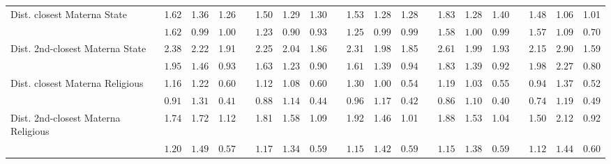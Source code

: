 \begin{center}
{\begin{longtable}{L{5cm} c c c p{.5cm} c c c p{.5cm} c c c p{.5cm} c c c p{.5cm} c c c}
Dist. closest Materna State & 1.62 &      1.36 &      1.26 & &      1.50 &      1.29 &      1.30 & &      1.53 &      1.28 &      1.28 & &      1.83 &      1.28 &      1.40 & &      1.48 &      1.06 &      1.01 \\*
& $\mathit{     1.62}$ & $\mathit{     0.99}$ & $\mathit{     1.00}$ & & $\mathit{     1.23}$ & $\mathit{     0.90}$ & $\mathit{     0.93}$ & & $\mathit{     1.25}$ & $\mathit{     0.99}$ & $\mathit{     0.99}$ & & $\mathit{     1.58}$ & $\mathit{     1.00}$ & $\mathit{     0.99}$ & & $\mathit{     1.57}$ & $\mathit{     1.09}$ & $\mathit{     0.70}$ \\[.7em]
Dist. 2nd-closest Materna State & 2.38 &      2.22 &      1.91 & &      2.25 &      2.04 &      1.86 & &      2.31 &      1.98 &      1.85 & &      2.61 &      1.99 &      1.93 & &      2.15 &      2.90 &      1.59 \\*
& $\mathit{     1.95}$ & $\mathit{     1.46}$ & $\mathit{     0.93}$ & & $\mathit{     1.63}$ & $\mathit{     1.23}$ & $\mathit{     0.90}$ & & $\mathit{     1.61}$ & $\mathit{     1.39}$ & $\mathit{     0.94}$ & & $\mathit{     1.83}$ & $\mathit{     1.39}$ & $\mathit{     0.92}$ & & $\mathit{     1.98}$ & $\mathit{     2.27}$ & $\mathit{     0.80}$ \\[.7em]
Dist. closest Materna Religious & 1.16 &      1.22 &      0.60 & &      1.12 &      1.08 &      0.60 & &      1.30 &      1.00 &      0.54 & &      1.19 &      1.03 &      0.55 & &      0.94 &      1.37 &      0.52 \\*
& $\mathit{     0.91}$ & $\mathit{     1.31}$ & $\mathit{     0.41}$ & & $\mathit{     0.88}$ & $\mathit{     1.14}$ & $\mathit{     0.44}$ & & $\mathit{     0.96}$ & $\mathit{     1.17}$ & $\mathit{     0.42}$ & & $\mathit{     0.86}$ & $\mathit{     1.10}$ & $\mathit{     0.40}$ & & $\mathit{     0.74}$ & $\mathit{     1.19}$ & $\mathit{     0.49}$ \\[.7em]
Dist. 2nd-closest Materna Religious & 1.74 &      1.72 &      1.12 & &      1.81 &      1.58 &      1.09 & &      1.92 &      1.46 &      1.01 & &      1.88 &      1.53 &      1.04 & &      1.50 &      2.12 &      0.92 \\*
& $\mathit{     1.20}$ & $\mathit{     1.49}$ & $\mathit{     0.57}$ & & $\mathit{     1.17}$ & $\mathit{     1.34}$ & $\mathit{     0.59}$ & & $\mathit{     1.15}$ & $\mathit{     1.42}$ & $\mathit{     0.59}$ & & $\mathit{     1.15}$ & $\mathit{     1.38}$ & $\mathit{     0.59}$ & & $\mathit{     1.12}$ & $\mathit{     1.44}$ & $\mathit{     0.60}$ \\[.7em]
\hline
\end{longtable}
}
\end{center}
